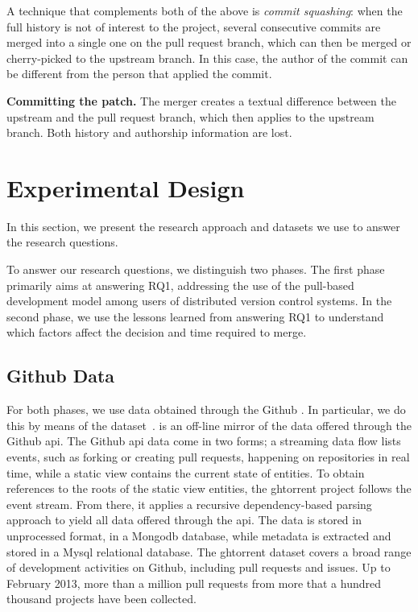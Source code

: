 \documentclass{acm_proc_article-sp}
\begin{document}
    A technique that complements both of the above is \emph{commit
    squashing}: when the full history is not of interest to the project,
    several consecutive commits are merged into a single one on the pull request
    branch, which can then be merged or cherry-picked to the upstream branch. In
    this case, the author of the commit can be different from the person that
    applied the commit.

    \textbf{Committing the patch.}
    The merger creates a
    textual difference between the upstream and the pull request branch, which
    then applies to the upstream branch. Both history and authorship information
    are lost.


\section{Experimental Design}

In this section, we present the research approach and datasets we use to 
answer the research questions.

To answer our research questions, we distinguish two phases.
The first phase primarily aims at answering RQ1, addressing the use of the pull-based development model among users
of distributed version control systems. 
In the second phase, we use the lessons learned from answering RQ1 to understand which factors affect the 
decision and time required to merge.

\subsection{Github Data}

For both phases, we use data obtained through the Github \api.
In particular, we do this by means of the \ghtorrent
dataset~\cite{GS12}.
%
\ghtorrent is  an off-line mirror of the data
offered through the Github {\sc api}. The Github {\sc api} 
data come in two forms; a streaming
data flow lists events, such as forking or creating pull requests, happening on
repositories in real time, while a static view contains the current state of
entities. To obtain references to the roots of the static view entities, the
{\sc ght}orrent project follows the event stream. From there, it applies a
recursive dependency-based parsing approach to yield all data offered through
the {\sc api}. The data is stored in unprocessed format, in a Mongo{\sc db}
database, while metadata is extracted and stored in a My{\sc sql} relational
database. The {\sc ght}orrent dataset covers a broad range of development
activities on Github, including pull requests and issues. Up to February 2013,
more than a million pull requests from more that a hundred thousand projects
have been collected.
\end{document}
